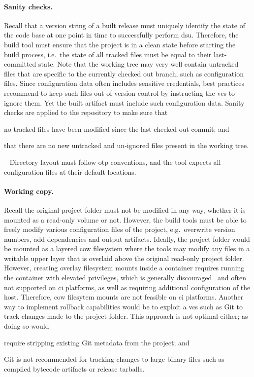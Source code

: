 \paragraph{Sanity checks.} Recall that a version string of a built release must uniquely identify the state of the code base at one point in time to successfully perform \acrshort{dsu}. Therefore, the build tool must ensure that the project is in a clean state before starting the build process, i.e.~the state of all tracked files must be equal to their last-committed state. Note that the working tree may very well contain untracked files that are specific to the currently checked out branch, such as configuration files. Since configuration data often includes sensitive credentials, best practices recommend to keep such files out of version control by instructing the \acrshort{vcs} to ignore them. Yet the built artifact must include such configuration data. Sanity checks are applied to the repository to make sure that \begin{enumerate*}[label=(\roman*)]
  \item no tracked files have been modified since the last checked out commit; and
  \item that there are no new untracked and un-ignored files present in the working tree.
\end{enumerate*}~\cite{man:git}
Directory layout must follow \acrshort{otp} conventions, and the tool expects all configuration files at their default locations.

\paragraph{Working copy.} Recall the original project folder must not be modified in any way, whether it is mounted as a read-only volume or not. However, the build tools must be able to freely modify various configuration files of the project, e.g.~overwrite version numbers, add dependencies and output artifacts.
Ideally, the project folder would be mounted as a layered \acrfull{cow} filesystem where the tools may modify any files in a writable upper layer that is overlaid above the original read-only project folder. However, creating overlay filesystem mounts inside a container requires running the container with elevated privileges, which is generally discouraged~\cite{docker:docs} and often not supported on \acrshort{ci} platforms, as well as requiring additional configuration of the host. Therefore, \acrshort{cow} filesytem mounts are not feasible on \acrshort{ci} platforms. Another way to implement rollback capabilities would be to exploit a \acrlong{vcs} such as Git to track changes made to the project folder. This approach is not optimal either; as doing so would \begin{enumerate*}[label=(\roman*)]
  \item require stripping existing Git metadata from the project; and
  \item Git is not recommended for tracking changes to large binary files such as compiled bytecode artifacts or release tarballs.
\end{enumerate*}

